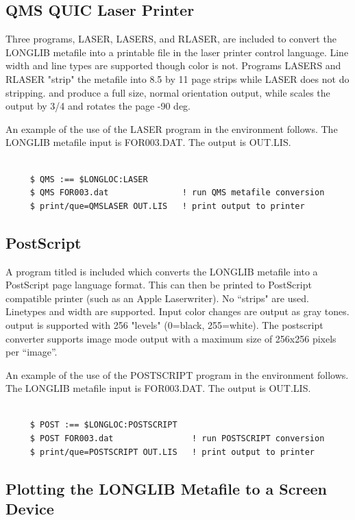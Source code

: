 \documentclass[11pt]{report}
\begin{document}
\subsection{QMS QUIC Laser Printer}

Three programs, LASER, LASERS, and RLASER, are included to convert the
LONGLIB metafile into a printable file in the   laser
printer control language.  Line width and line types are supported
though color is not.  Programs LASERS and RLASER "strip" the metafile
into 8.5 by 11 page strips while LASER does not do stripping.
 and  produce a full size, normal orientation
output, while  scales the output by 3/4 and rotates the
page -90 deg.

An example of the use of the LASER program in the  environment
follows.  The LONGLIB metafile input is FOR003.DAT.  The output
is OUT.LIS.
\begin{verbatim}

     $ QMS :== $LONGLOC:LASER
     $ QMS FOR003.dat               ! run QMS metafile conversion
     $ print/que=QMSLASER OUT.LIS   ! print output to printer
\end{verbatim}

\subsection{PostScript}

A program titled  is included which converts the
LONGLIB metafile into a PostScript page language format.  This can
then be printed to PostScript compatible printer (such as an Apple
Laserwriter).  No ``strips" are used. Linetypes and width are
supported.  Input color changes are output as gray tones.  
output is supported with 256  "levels" (0=black, 255=white).
The postscript converter supports image mode output with a maximum
size of 256x256 pixels per ``image''.

An example of the use of the POSTSCRIPT program in the 
environment follows.  The LONGLIB metafile input is FOR003.DAT.  The
output is OUT.LIS.
\begin{verbatim}

     $ POST :== $LONGLOC:POSTSCRIPT
     $ POST FOR003.dat                ! run POSTSCRIPT conversion
     $ print/que=POSTSCRIPT OUT.LIS   ! print output to printer
\end{verbatim}


\subsection{Plotting the LONGLIB Metafile to a Screen Device}
\end{document}
